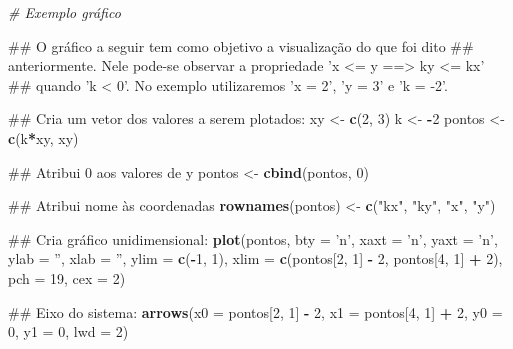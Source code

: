 \documentclass[]{book}
\newenvironment{Shaded}{\begin{snugshade}}{\end{snugshade}}
\newcommand{\KeywordTok}[1]{\textcolor[rgb]{0.13,0.29,0.53}{\textbf{#1}}}
\newcommand{\DataTypeTok}[1]{\textcolor[rgb]{0.13,0.29,0.53}{#1}}
\newcommand{\DecValTok}[1]{\textcolor[rgb]{0.00,0.00,0.81}{#1}}
\newcommand{\StringTok}[1]{\textcolor[rgb]{0.31,0.60,0.02}{#1}}
\newcommand{\CommentTok}[1]{\textcolor[rgb]{0.56,0.35,0.01}{\textit{#1}}}
\newcommand{\OperatorTok}[1]{\textcolor[rgb]{0.81,0.36,0.00}{\textbf{#1}}}
\newcommand{\NormalTok}[1]{#1}
\begin{document}
\begin{Shaded}
\begin{Highlighting}[]
\CommentTok{# Exemplo gráfico}

\NormalTok{##  O gráfico a seguir tem como objetivo a visualização do que foi dito}
\NormalTok{## anteriormente. Nele pode-se observar a propriedade 'x <= y  ==>  ky <= kx'}
\NormalTok{## quando 'k < 0'. No exemplo utilizaremos 'x = 2', 'y = 3' e 'k = -2'.}

\NormalTok{##  Cria um vetor dos valores a serem plotados:}
\NormalTok{xy <-}\StringTok{ }\KeywordTok{c}\NormalTok{(}\DecValTok{2}\NormalTok{, }\DecValTok{3}\NormalTok{)}
\NormalTok{k <-}\StringTok{ }\OperatorTok{-}\DecValTok{2}
\NormalTok{pontos <-}\StringTok{ }\KeywordTok{c}\NormalTok{(k}\OperatorTok{*}\NormalTok{xy, xy)}

\NormalTok{##  Atribui 0 aos valores de y}
\NormalTok{pontos <-}\StringTok{ }\KeywordTok{cbind}\NormalTok{(pontos, }\DecValTok{0}\NormalTok{)}

\NormalTok{##  Atribui nome às coordenadas}
\KeywordTok{rownames}\NormalTok{(pontos) <-}\StringTok{ }\KeywordTok{c}\NormalTok{(}\StringTok{"kx"}\NormalTok{, }\StringTok{"ky"}\NormalTok{, }\StringTok{"x"}\NormalTok{, }\StringTok{"y"}\NormalTok{)}

\NormalTok{##  Cria gráfico unidimensional:}
\KeywordTok{plot}\NormalTok{(pontos, }\DataTypeTok{bty =} \StringTok{'n'}\NormalTok{, }\DataTypeTok{xaxt =} \StringTok{'n'}\NormalTok{, }\DataTypeTok{yaxt =} \StringTok{'n'}\NormalTok{, }\DataTypeTok{ylab =} \StringTok{''}\NormalTok{, }\DataTypeTok{xlab =} \StringTok{''}\NormalTok{,}
     \DataTypeTok{ylim =} \KeywordTok{c}\NormalTok{(}\OperatorTok{-}\DecValTok{1}\NormalTok{, }\DecValTok{1}\NormalTok{),}
     \DataTypeTok{xlim =} \KeywordTok{c}\NormalTok{(pontos[}\DecValTok{2}\NormalTok{, }\DecValTok{1}\NormalTok{] }\OperatorTok{-}\StringTok{ }\DecValTok{2}\NormalTok{, pontos[}\DecValTok{4}\NormalTok{, }\DecValTok{1}\NormalTok{] }\OperatorTok{+}\StringTok{ }\DecValTok{2}\NormalTok{), }\DataTypeTok{pch =} \DecValTok{19}\NormalTok{, }\DataTypeTok{cex =} \DecValTok{2}\NormalTok{)}

\NormalTok{##  Eixo do sistema:}
\KeywordTok{arrows}\NormalTok{(}\DataTypeTok{x0 =}\NormalTok{ pontos[}\DecValTok{2}\NormalTok{, }\DecValTok{1}\NormalTok{] }\OperatorTok{-}\StringTok{ }\DecValTok{2}\NormalTok{, }\DataTypeTok{x1 =}\NormalTok{ pontos[}\DecValTok{4}\NormalTok{, }\DecValTok{1}\NormalTok{] }\OperatorTok{+}\StringTok{ }\DecValTok{2}\NormalTok{,}
       \DataTypeTok{y0 =} \DecValTok{0}\NormalTok{, }\DataTypeTok{y1 =} \DecValTok{0}\NormalTok{, }\DataTypeTok{lwd =} \DecValTok{2}\NormalTok{)}


\end{Highlighting}
\end{Shaded}
\end{document}
